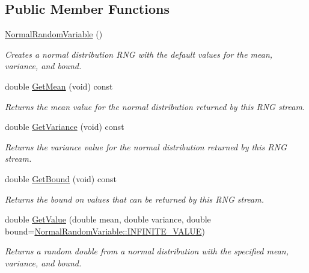 \subsection*{Public Member Functions}
\begin{DoxyCompactItemize}
\item 
\hyperlink{classns3_1_1NormalRandomVariable_af741336427b831b41a5e1595156aeb39}{Normal\+Random\+Variable} ()
\begin{DoxyCompactList}\small\item\em Creates a normal distribution R\+NG with the default values for the mean, variance, and bound. \end{DoxyCompactList}\item 
double \hyperlink{classns3_1_1NormalRandomVariable_a4855e57cd04c880a79b4139defbe1f25}{Get\+Mean} (void) const 
\begin{DoxyCompactList}\small\item\em Returns the mean value for the normal distribution returned by this R\+NG stream. \end{DoxyCompactList}\item 
double \hyperlink{classns3_1_1NormalRandomVariable_a3792b2cf1093c17ecf92a43e6894124e}{Get\+Variance} (void) const 
\begin{DoxyCompactList}\small\item\em Returns the variance value for the normal distribution returned by this R\+NG stream. \end{DoxyCompactList}\item 
double \hyperlink{classns3_1_1NormalRandomVariable_af145cba3b62a35bc5878a02b1d782ff5}{Get\+Bound} (void) const 
\begin{DoxyCompactList}\small\item\em Returns the bound on values that can be returned by this R\+NG stream. \end{DoxyCompactList}\item 
double \hyperlink{classns3_1_1NormalRandomVariable_a0134d131477bc439cc6ff7cbe84b03a9}{Get\+Value} (double mean, double variance, double bound=\hyperlink{classns3_1_1NormalRandomVariable_a813486b91a0d043421a54e47f112b343}{Normal\+Random\+Variable\+::\+I\+N\+F\+I\+N\+I\+T\+E\+\_\+\+V\+A\+L\+UE})
\begin{DoxyCompactList}\small\item\em Returns a random double from a normal distribution with the specified mean, variance, and bound. \end{DoxyCompactList}\item 

\end{DoxyCompactItemize}
